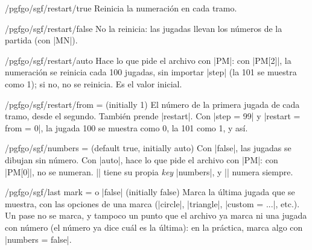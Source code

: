 \begin{key}{/pgfgo/sgf/restart/true}
	Reinicia la numeración en cada tramo.
\end{key}

\begin{key}{/pgfgo/sgf/restart/false}
	No la reinicia: las jugadas llevan los números de la partida (con |MN|).
\end{key}

\begin{key}{/pgfgo/sgf/restart/auto}
	Hace lo que pide el archivo con |PM|: con |PM[2]|, la numeración se reinicia cada 100 jugadas, sin importar |step| (la 101 se muestra como 1); si no, no se reinicia. Es el valor inicial.
\end{key}

\begin{key}{/pgfgo/sgf/restart/from =  (initially 1)}
	El número de la primera jugada de cada tramo, desde el segundo. También prende |restart|. Con |step = 99| y |restart = {from = 0}|, la jugada 100 se muestra como 0, la 101 como 1, y así.

	\begin{codeexample}[]
		\begin{goban}[sgf size = variantes]
		\end{goban}
	\end{codeexample}
\end{key}

\begin{key}{/pgfgo/sgf/numbers =  (default true, initially auto)}
	Con |false|, las jugadas se dibujan sin número. Con |auto|, hace lo que pide el archivo con |PM|: con |PM[0]|, no se numeran. |\sgfdiagrams| tiene su propia \emph{key} |numbers|, y |\sgfproblem| numera siempre.

	\begin{codeexample}[]
		\begin{goban}[sgf size = variantes]
		\end{goban}
	\end{codeexample}
\end{key}

\begin{key}{/pgfgo/sgf/last mark =  o |false| (initially false)}
	Marca la última jugada que se muestra, con las opciones de una marca (|circle|, |triangle|, |custom = ...|, etc.). Un pase no se marca, y tampoco un punto que el archivo ya marca ni una jugada con número (el número ya dice cuál es la última): en la práctica, marca algo con |numbers = false|.

	\begin{codeexample}[]
		\begin{goban}[sgf size = variantes]
		\end{goban}
	\end{codeexample}
\end{key}

